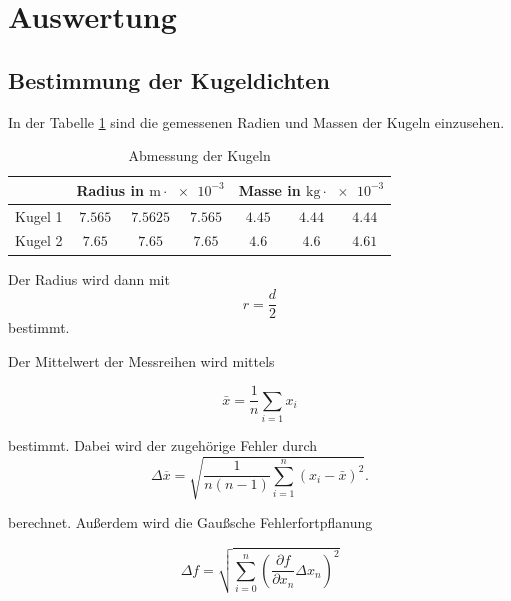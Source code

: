 \section{Auswertung}


\subsection{Bestimmung der Kugeldichten}

In der Tabelle \ref{tab:messwerte_kugel} sind die gemessenen
Radien und Massen der Kugeln einzusehen.

\begin{table}
\centering
\begin{tabular} {ccccccc} %
	\toprule
  & \multicolumn{3}{c}{Radius in $\si{\meter}\cdot \num{e-3}$}  & \multicolumn{3}{c}{Masse in $\si{\kilogram}\cdot \num{e-3}$} \\
\midrule 
Kugel 1 & $\num{7.565} $&  $\num{7.5625} $ & $\num{7.565} $  & $\num{4.45}$ & $\num{4.44} $ & $\num{4.44} $ \\
Kugel 2  & $\num{7.65} $&  $\num{7.65} $ & $\num{7.65} $ & $\num{4.6}$ & $\num{4.6} $ & $\num{4.61} $ \\
\bottomrule
\end{tabular}
\caption{Abmessung der Kugeln}
\label{tab:messwerte_kugel}
\end{table}

Der Radius wird dann mit
\begin{equation*}
r=\frac{d}{2}
\end{equation*}
bestimmt.

Der Mittelwert der Messreihen wird mittels

\begin{equation}
\label{eq:mittel}
\bar{x}=\frac{1}{n}\sum_{i=1}x_i
\end{equation}

bestimmt. Dabei wird der zugehörige Fehler
durch
\begin{equation}
\label{eq:stand_ab}
\Delta \overline{x}=\sqrt{\frac{1}{n(n-1)}\sum_{i=1}^{n}(x_i-\bar{x})^2}.
\end{equation}

berechnet.
Außerdem wird die Gaußsche Fehlerfortpflanung

\begin{equation}
\label{eq:gauss}
\Delta f=\sqrt{\sum_{i=0}^n\left(\frac{\partial f}{\partial x_n} \Delta x_n\right)^2}
\end{equation}

